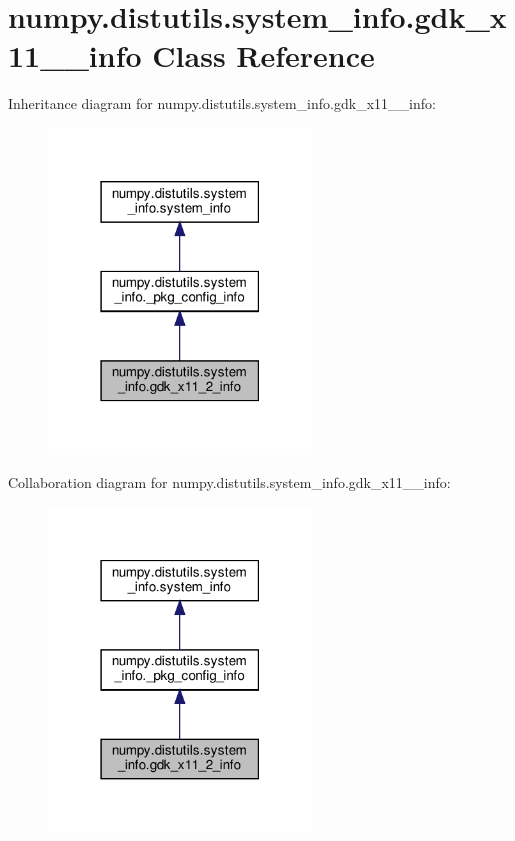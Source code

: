 \hypertarget{classnumpy_1_1distutils_1_1system__info_1_1gdk__x11__2__info}{}\section{numpy.\+distutils.\+system\+\_\+info.\+gdk\+\_\+x11\+\_\+\_\+info Class Reference}
\label{classnumpy_1_1distutils_1_1system__info_1_1gdk__x11__2__info}


Inheritance diagram for numpy.\+distutils.\+system\+\_\+info.\+gdk\+\_\+x11\+\_\+\_\+info\+:
\nopagebreak
\begin{figure}[H]
\begin{center}
\leavevmode
\includegraphics[width=198pt]{classnumpy_1_1distutils_1_1system__info_1_1gdk__x11__2__info__inherit__graph}
\end{center}
\end{figure}


Collaboration diagram for numpy.\+distutils.\+system\+\_\+info.\+gdk\+\_\+x11\+\_\+\_\+info\+:
\nopagebreak
\begin{figure}[H]
\begin{center}
\leavevmode
\includegraphics[width=198pt]{classnumpy_1_1distutils_1_1system__info_1_1gdk__x11__2__info__coll__graph}
\end{center}
\end{figure}
